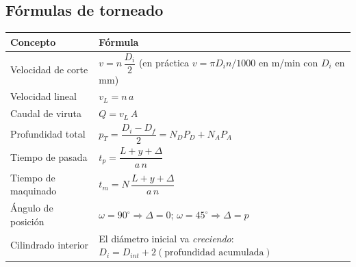\documentclass[12pt,a4paper]{article}
\begin{document}
\subsection{Fórmulas de torneado}
\begin{center}
	\small
	\begin{tabular}{@{}ll@{}}
		\toprule
		\textbf{Concepto}   & \textbf{Fórmula}
		\\
		\midrule
		Velocidad de corte  & $v = n\,\dfrac{D_i}{2}$ (en práctica $v = \pi D_i
			                                                           n/1000$ en
		m/min con $D_i$ en mm)
		\\[6pt]
		Velocidad lineal    & $v_L = n\, a$
		\\[3pt]
		Caudal de viruta    & $Q = v_L\, A$
		\\[3pt]
		Profundidad total   & $p_T = \dfrac{D_i - D_f}{2} = N_D P_D + N_A P_A$
		\\[6pt]
		Tiempo de pasada    & $t_p = \dfrac{L + y + \Delta}{a\, n}$
		\\[6pt]
		Tiempo de maquinado & $t_m = N\,\dfrac{L + y + \Delta}{a\, n}$
		\\
		Ángulo de posición  & $\omega = 90^\circ \Rightarrow \Delta = 0$; $\omega =
			                                                                  45^\circ
			                                                                  \Rightarrow
			                                                                  \Delta =
			                                                                  p$
		\\
		Cilindrado interior & El diámetro inicial va \emph{creciendo}: $D_i =
			                                                               D_{int} +
			                                                               2(\text{profundidad
				                                                               acumulada})$
		\\
		\bottomrule
	\end{tabular}
\end{center}
\end{document}
